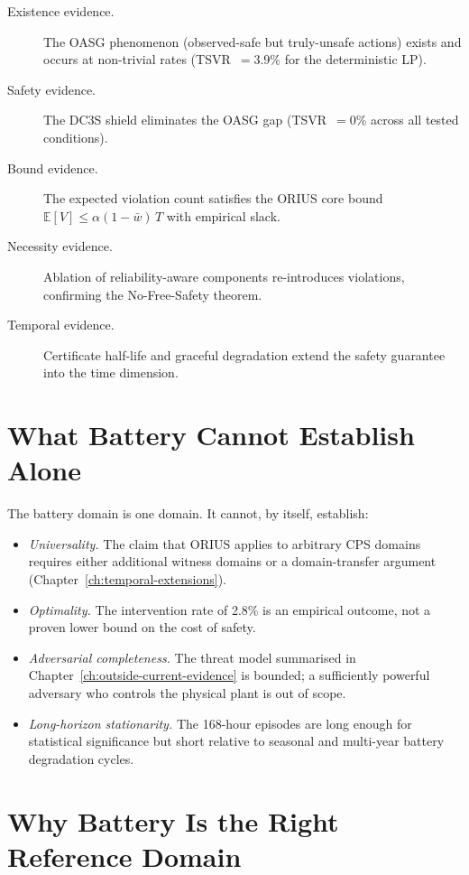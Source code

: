 \begin{description}
  \item[Existence evidence.]  The OASG phenomenon (observed-safe but
    truly-unsafe actions) exists and occurs at non-trivial rates
    (TSVR~$= 3.9$\% for the deterministic LP).
  \item[Safety evidence.]  The DC3S shield eliminates the OASG gap
    (TSVR~$= 0$\% across all tested conditions).
  \item[Bound evidence.]  The expected violation count satisfies the
    ORIUS core bound $\mathbb{E}[V] \le \alpha (1 - \bar{w})\,T$
    with empirical slack.
  \item[Necessity evidence.]  Ablation of reliability-aware components
    re-introduces violations, confirming the No-Free-Safety theorem.
  \item[Temporal evidence.]  Certificate half-life and graceful
    degradation extend the safety guarantee into the time dimension.
\end{description}

\section{What Battery Cannot Establish Alone}

The battery domain is one domain.  It cannot, by itself, establish:
\begin{itemize}
  \item \emph{Universality.}  The claim that ORIUS applies to arbitrary
    CPS domains requires either additional witness domains or a
    domain-transfer argument (Chapter~\ref{ch:temporal-extensions}).
  \item \emph{Optimality.}  The intervention rate of 2.8\% is an
    empirical outcome, not a proven lower bound on the cost of safety.
  \item \emph{Adversarial completeness.}  The threat model
    summarised in Chapter~\ref{ch:outside-current-evidence} is bounded; a sufficiently
    powerful adversary who controls the physical plant is out of scope.
  \item \emph{Long-horizon stationarity.}  The 168-hour episodes are
    long enough for statistical significance but short relative to
    seasonal and multi-year battery degradation cycles.
\end{itemize}

\section{Why Battery Is the Right Reference Domain}

